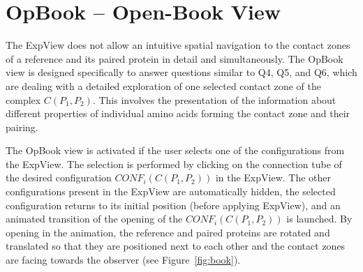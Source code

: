 \documentclass{bmcart}
\begin{document}

\section{OpBook -- Open-Book View}
The ExpView does not allow an intuitive spatial navigation to the contact zones of a reference and its paired protein in detail and simultaneously.
The OpBook view is designed specifically to answer questions similar to Q4, Q5, and Q6, which are dealing with a detailed exploration of one selected contact zone of the complex $C(P_1,P_2)$.
This involves the presentation of the information about different properties of individual amino acids forming the contact zone and their pairing.

The OpBook view is activated if the user selects one of the configurations from the ExpView. 
The selection is performed by clicking on the connection tube of the desired configuration $CONF_i(C(P_1,P_2))$ in the ExpView.
The other configurations present in the ExpView are automatically hidden, the selected configuration returns to its initial position (before applying ExpView), and an animated transition of the opening of the $CONF_i(C(P_1,P_2))$ is launched.
By opening in the animation, the reference and paired proteins are rotated and translated so that they are positioned next to each other and the contact zones are facing towards the observer (see Figure~\ref{fig:book}). 
\end{document}
